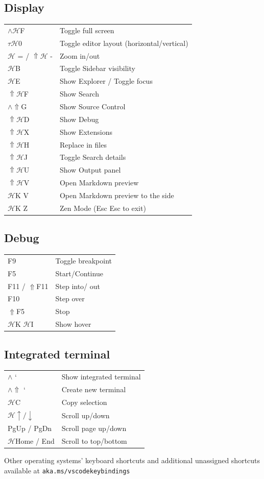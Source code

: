 \documentclass[UTF8]{article}
\begin{document}
\subsection*{Display}
\begin{tabular}{ll}
$\wedge\mathscr{H}$F & Toggle full screen \\
$\tau\mathscr{H}$0 & Toggle editor layout (horizontal/vertical) \\
$\mathscr{H}$ = / $\Uparrow\mathscr{H}$ - & Zoom in/out \\
$\mathscr{H}$B & Toggle Sidebar visibility \\
$\mathscr{H}$E & Show Explorer / Toggle focus \\
$\Uparrow\mathscr{H}$F & Show Search \\
$\wedge\Uparrow$G & Show Source Control \\
$\Uparrow\mathscr{H}$D & Show Debug \\
$\Uparrow\mathscr{H}$X & Show Extensions \\
$\Uparrow\mathscr{H}$H & Replace in files \\
$\Uparrow\mathscr{H}$J & Toggle Search details \\
$\Uparrow\mathscr{H}$U & Show Output panel \\
$\Uparrow\mathscr{H}$V & Open Markdown preview \\
$\mathscr{H}$K V & Open Markdown preview to the side \\
$\mathscr{H}$K Z & Zen Mode (Esc Esc to exit)
\end{tabular}

\subsection*{Debug}
\begin{tabular}{ll}
F9 & Toggle breakpoint \\
F5 & Start/Continue \\
F11 / $\Uparrow$F11 & Step into/ out \\
F10 & Step over \\
$\Uparrow$F5 & Stop \\
$\mathscr{H}$K $\mathscr{H}$I & Show hover
\end{tabular}

\subsection*{Integrated terminal}
\begin{tabular}{ll}
$\wedge$ ` & Show integrated terminal \\
$\wedge\Uparrow$ ` & Create new terminal \\
$\mathscr{H}$C & Copy selection \\
$\mathscr{H}\uparrow / \downarrow$ & Scroll up/down \\
PgUp / PgDn & Scroll page up/down \\
$\mathscr{H}$Home / End & Scroll to top/bottom
\end{tabular}

Other operating systems' keyboard shortcuts and additional unassigned shortcuts available at \texttt{aka.ms/vscodekeybindings}
\end{document}
